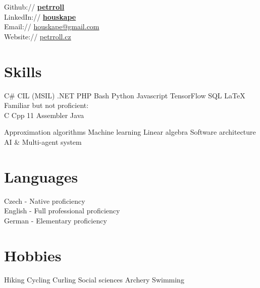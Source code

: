 \documentclass[a4paper]{deedy-resume} %
\begin{document}
\begin{minipage}[t]{0.33\textwidth}
Github:// \href{https://github.com/petrroll}{\bf petrroll} \\
LinkedIn:// \href{https://www.linkedin.com/in/houskape}{\bf houskape} \\
Email:// \href{mailto:houskape@gmail.com}{houskape@gmail.com} \\
Website:// \href{http://www.petrroll.cz}{petrroll.cz} \\

\sectionspace %


\section{Skills}


C\# \textbullet{} CIL (MSIL) \textbullet{} .NET \textbullet{} PHP \textbullet{} Bash \textbullet{} Python \textbullet{}
Javascript \textbullet{} TensorFlow \textbullet{} SQL \textbullet{} \LaTeX \\ 
\halfsectionspace %
Familiar but not proficient: \\
C \textbullet{} Cpp 11 \textbullet{} Assembler \textbullet{} Java

\sectionspace %


Approximation algorithms \textbullet{} Machine learning \textbullet{} Linear algebra \textbullet{} Software architecture \textbullet{} AI \& Multi-agent system

\sectionspace %

\section{Languages}

Czech - Native proficiency \\
English - Full professional proficiency \\
German - Elementary proficiency

\sectionspace %

\section{Hobbies}

Hiking \textbullet{} Cycling \textbullet{} Curling \textbullet{} Social sciences \textbullet{} Archery \textbullet{} Swimming

\sectionspace %


\end{minipage} %
\end{document}
